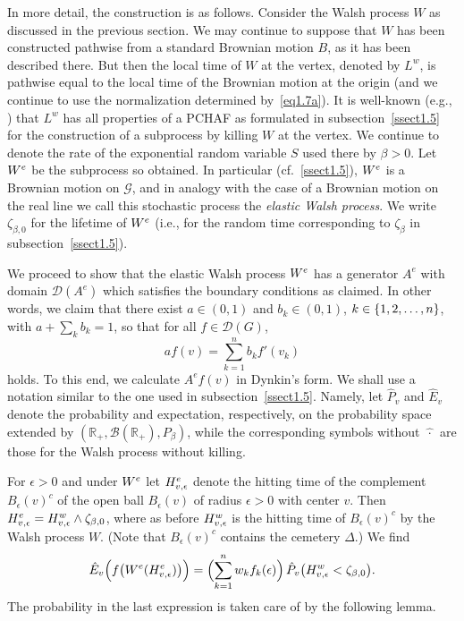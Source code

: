 \documentclass[11pt,a4paper]{amsart}
\newcommand{\gb}{\beta}
\newcommand{\gep}{\epsilon}
\newcommand{\gD}{\Delta}
\newcommand{\cB}{\mathcal{B}}
\newcommand{\cD}{\mathcal{D}}
\newcommand{\cG}{\mathcal{G}}
\newcommand{\1}{1}
\newcommand{\R}{\mathbb{R}}
\theoremstyle{remark}
\newcommand{\sn}{\ensuremath\{1,2,\dotsc,n\}}
\newcommand{\TW}{\ensuremath H^w}
\newcommand{\We}{\ensuremath W^e}
\newcommand{\TeW}{\ensuremath H^e}
\newcommand{\hP}{\ensuremath{\hat P}}
\newcommand{\hE}{\ensuremath{\hat E}}
\numberwithin{equation}{section}
\begin{document}
In more detail, the construction is as follows.
Consider the Walsh process $W$ as discussed in the previous section. We may continue
to suppose that $W$ has been constructed pathwise from a standard Brownian motion
$B$, as it has been described there. But then the local time of $W$ at the vertex,
denoted by $L^w$, is pathwise equal to the local time of the Brownian motion at the
origin (and we continue to use the normalization determined by~\eqref{eq1.7a}). It
is well-known (e.g., \cite{ItMc74, Kn81, KaSh91, ReYo91}) that $L^w$ has all
properties of a PCHAF as formulated in subsection~\ref{ssect1.5} for the construction
of a subprocess by killing $W$ at the vertex. We continue to denote the rate of the
exponential random variable $S$ used there by $\gb>0$. Let $\We$ be the subprocess
so obtained. In particular (cf.~\ref{ssect1.5}), $\We$ is a Brownian motion on
$\cG$, and in analogy with the case of a Brownian motion on the real line we call
this stochastic process the \emph{elastic Walsh process}. We write $\zeta_{\gb,0}$
for the lifetime of $\We$ (i.e., for the random time corresponding to $\zeta_\gb$ in
subsection~\ref{ssect1.5}).

We proceed to show that the elastic Walsh process $\We$ has a generator $A^e$ with
domain $\cD(A^e)$
which satisfies the boundary conditions as claimed. In other words, we claim that there
exist $a\in(0,1)$ and $b_k\in (0,1)$, $k\in\sn$, with $a + \sum_k b_k =1$, so that
for all $f\in\cD(G)$,
\begin{equation}    \label{eq3.1}
    a f(v) = \sum_{k=1}^n b_k f'(v_k)
\end{equation}
holds. To this end, we calculate $A^e f(v)$ in Dynkin's form. We shall use a notation
similar to the one used in subsection~\ref{ssect1.5}. Namely, let $\hP_v$ and $\hE_v$
denote the probability and expectation, respectively, on the probability space extended by
$(\R_+,\cB(\R_+),P_\gb)$, while the corresponding symbols without $\hat{\,\cdot\,}$
are those for the Walsh process without killing.

For $\gep>0$ and under $\We$ let $\TeW_{v,\gep}$ denote the hitting time of the
complement $B_\gep(v)^c$  of the open ball $B_\gep(v)$ of radius $\gep>0$ with center $v$. Then
$\TeW_{v,\gep} = \TW_{v,\gep} \land \zeta_{\gb,0}$, where as before $\TW_{v,\gep}$
is the hitting time of $B_\gep(v)^c$ by the Walsh process $W$. (Note that $B_\gep(v)^c$
contains the cemetery $\gD$.) We find
\begin{equation}    \label{eq3.1a}
    \hE_v\Bigl(f\bigl(\We(\TeW_{v,\gep})\bigr)\Bigr)
        = \Bigl(\sum_{k=1}^n w_k f_k(\gep)\Bigr)\,\hP_v\bigl(\TW_{v,\gep}<\zeta_{\gb,0}\bigr).
\end{equation}
The probability in the last expression is taken care of by the following lemma.
\end{document}
